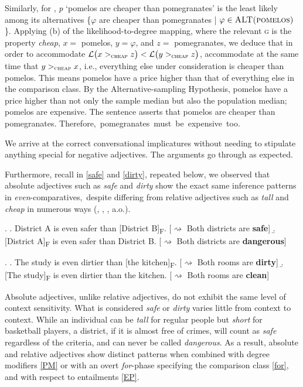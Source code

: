 \documentclass[12pt,letterpaper]{scrartcl}
\makeatletter
\newif\if@repeated\@repeatedfalse
\newcounter{savedExNo}
\newcommand{\exr}[1]{%
\@repeatedtrue
\setcounter{savedExNo}{\value{ExNo}}
\def\tmp@ref{#1}
\ex.}
\newcommand{\alignright}{\hspace*{\fill}}
\newcommand{\infer}{$\rightsquigarrow$ }
\newcommand{\sub}[1]{\textsubscript{#1}}
\makeatother
\begin{document}
Similarly, for \Last[b], \textit{p} `pomelos are cheaper than pomegranates' is the least likely among its alternatives \{$\varphi$ are cheaper than pomegranates | $\varphi \in \textsc{ALT(pomelos)}$\}. Applying (b) of the likelihood-to-degree mapping, where the relevant \textsc{g} is the property \textit{cheap}, $x =$ pomelos, $y = \varphi$, and $z = $ pomegranates, we deduce that in order to accommodate $\mathcal{L}\big( x >_\textsc{cheap} z \big) < \mathcal{L}\big( y >_\textsc{cheap} z\big)$, accommodate at the same time that $y >_\textsc{cheap} x$, i.e., everything else under consideration is cheaper than pomelos. This means pomelos have a price higher than that of everything else in the comparison class. By the Alternative-sampling Hypothesis, pomelos have a price higher than not only the sample median but also the population median; pomelos are expensive. The sentence asserts that pomelos are cheaper than pomegranates. \mbox{Therefore, pomegranates must be expensive too.}

We arrive at the correct conversational implicatures without needing to stipulate anything special for negative adjectives. The arguments go through as expected.

Furthermore, recall in \ref{safe} and \ref{dirty}, repeated below, we observed that absolute adjectives such as \textit{safe} and \textit{dirty} show the exact same inference patterns in \textit{even}-comparatives, despite differing from relative adjectives such as \textit{tall} and \textit{cheap} in numerous ways (\cite{rotstein_total_2004}, \cite{kennedy_scale_2005}, \cite{kennedy_vagueness_2007}, a.o.). 

\exr{safe} \a. District A is even safer than [District B]\sub{F}. \alignright [\infer Both districts are \textbf{safe}]
\b. [District A]\sub{F} is even safer than District B. \alignright [\infer Both districts are \textbf{dangerous}]

\exr{dirty} \a. The study is even dirtier than [the kitchen]\sub{F}. \alignright [\infer Both rooms are \textbf{dirty}]
\b. [The study]\sub{F} is even dirtier than the kitchen. \alignright [\infer Both rooms are \textbf{clean}]

Absolute adjectives, unlike relative adjectives, do not exhibit the same level of context sensitivity. What is considered \textit{safe} or \textit{dirty} varies little from context to context. While an individual can be \textit{tall} for regular people but \textit{short} for basketball players, a district, if it is almost free of crimes, will count as \textit{safe} regardless of the criteria, and can never be called \textit{dangerous}. As a result, absolute and relative adjectives show distinct patterns when combined with degree modifiers \ref{PM} or with an overt \textit{for}-phase specifying the comparison class \ref{for}, and with respect to entailments \ref{EP}.
\end{document}
